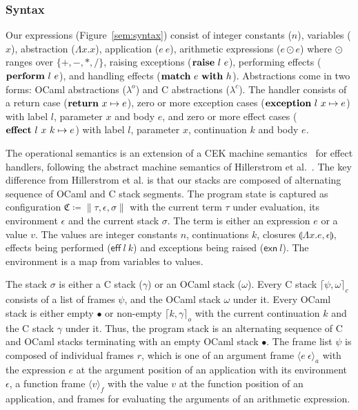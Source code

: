 \documentclass[sigplan,10pt,review,anonymous]{acmart}\settopmatter{printfolios=true,printccs=false,printacmref=false}
\newcommand{\lam}[2]{\Lambda #1. #2}
\newcommand{\env}{\epsilon}
\newcommand{\clos}[3]{\llparenthesis \lam{#1}{#2}, #3 \rrparenthesis}
\newcommand{\kw}[1]{\text{\bf #1}}
\newcommand{\effval}[2]{\textsf{eff} ~#1 ~#2}
\newcommand{\exnval}[1]{\textsf{exn} ~#1}
\newcommand{\handle}[2]{\kw{match} ~#1 ~\kw{with} ~#2}
\newcommand{\throw}[2]{\kw{raise} ~#1 ~#2}
\newcommand{\perform}[2]{\kw{perform} ~#1 ~#2}
\newcommand{\caseval}[2]{\kw{return}~#1 \mapsto #2}
\newcommand{\caseexn}[3]{\kw{exception} ~#1 ~#2 \mapsto #3}
\newcommand{\caseeff}[4]{\kw{effect} ~#1 ~#2 ~#3 \mapsto #4}
\newcommand{\farg}[2]{\langle #1 ~#2 \rangle_a}
\newcommand{\ffun}[1]{\langle #1 \rangle_f}
\newcommand{\fl}{\psi} %
\newcommand{\cstack}{\gamma} %
\newcommand{\ostack}{\omega} %
\newcommand{\cstacka}[2]{\big \lceil #1, #2 \big \rceil_c} %
\newcommand{\ostacka}[2]{\big \lceil #1, #2 \big \rceil_o} %
\newcommand{\ostackemp}{\bullet}
\newcommand{\stack}{\sigma}
\newcommand{\config}{\mathfrak{C}}
\newcommand{\configa}[3]{\|#1,#2,#3\|}
\begin{document}
\subsubsection{Syntax} Our expressions (Figure~\ref{sem:syntax}) consist of
integer constants ($n$), variables ($x$), abstraction ($\lam{x}{x}$),
application ($e~e$), arithmetic expressions ($e \odot e$) where $\odot$ ranges
over $\{+,-,*,/\}$, raising exceptions ($\throw{l}{e}$), performing effects
($\perform{l}{e}$), and handling effects ($\handle{e}{h}$). Abstractions come
in two forms: OCaml abstractions ($\lambda^o$) and C abstractions
($\lambda^c$). The handler consists of a return case ($\caseval{x}{e}$), zero
or more exception cases ($\caseexn{l}{x}{e}$) with label $l$, parameter $x$ and
body $e$, and zero or more effect cases ($\caseeff{l}{x}{k}{e}$) with label
$l$, parameter $x$, continuation $k$ and body $e$.

The operational semantics is an extension of a CEK machine
semantics~\cite{Felleisen86} for effect handlers, following the abstract
machine semantics of Hillerstrom et al.~\cite{Hillerstrom20}. The key
difference from Hillerstrom et al. is that our stacks are composed of
alternating sequence of OCaml and C stack segments. The program state is
captured as configuration $\config \coloneqq \configa{\tau}{\env}{\stack}$ with
the current term $\tau$ under evaluation, its environment $\env$ and the
current stack $\stack$. The term is either an expression $e$ or a value $v$.
The values are integer constants $n$, continuations $k$, closures
$\clos{x}{e}{\env}$, effects being performed ($\effval{l}{k}$) and exceptions
being raised ($\exnval{l}$). The environment is a map from variables to values.

The stack $\stack$ is either a C stack ($\cstack$) or an OCaml stack
($\ostack$). Every C stack $\cstacka{\fl}{\ostack}$ consists of a list of
frames $\fl$, and the OCaml stack $\ostack$ under it. Every OCaml stack is
either empty $\ostackemp$ or non-empty $\ostacka{k}{\cstack}$ with the current
continuation $k$ and the C stack $\cstack$ under it. Thus, the program stack is
an alternating sequence of C and OCaml stacks terminating with an empty OCaml
stack $\ostackemp$. The frame list $\fl$ is composed of individual frames $r$,
which is one of an argument frame $\farg{e}{\env}$ with the expression $e$ at
the argument position of an application with its environment $\env$, a function
frame $\ffun{v}$ with the value $v$ at the function position of an application,
and frames for evaluating the arguments of an arithmetic expression.
\end{document}
